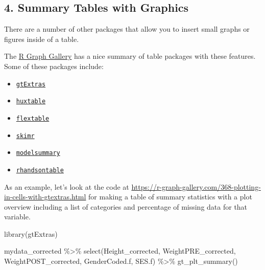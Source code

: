 \documentclass[
  letterpaper,
  DIV=11,
  numbers=noendperiod]{scrartcl}
\newenvironment{Shaded}{\begin{snugshade}}{\end{snugshade}}
\newcommand{\FunctionTok}[1]{\textcolor[rgb]{0.28,0.35,0.67}{#1}}
\newcommand{\NormalTok}[1]{\textcolor[rgb]{0.00,0.23,0.31}{#1}}
\newcommand{\SpecialCharTok}[1]{\textcolor[rgb]{0.37,0.37,0.37}{#1}}
\providecommand{\tightlist}{%
  \setlength{\itemsep}{0pt}\setlength{\parskip}{0pt}}\usepackage{longtable,booktabs,array}
\begin{document}
\subsection{4. Summary Tables with
Graphics}\label{summary-tables-with-graphics}

There are a number of other packages that allow you to insert small
graphs or figures inside of a table.

The \href{https://r-graph-gallery.com/table.html}{R Graph Gallery} has a
nice summary of table packages with these features. Some of these
packages include:

\begin{itemize}
\tightlist
\item
  \href{https://cran.r-project.org/web/packages/gtExtras/index.html}{\texttt{gtExtras}}
\item
  \href{https://cran.r-project.org/web/packages/huxtable/index.html}{\texttt{huxtable}}
\item
  \href{https://ardata-fr.github.io/flextable-book/index.html\#help-and-resources}{\texttt{flextable}}
\item
  \href{https://cran.r-project.org/web/packages/skimr/index.html}{\texttt{skimr}}
\item
  \href{https://modelsummary.com/vignettes/datasummary.html}{\texttt{modelsummary}}
\item
  \href{https://cran.r-project.org/web/packages/rhandsontable/index.html}{\texttt{rhandsontable}}
\end{itemize}

As an example, let's look at the code at
\url{https://r-graph-gallery.com/368-plotting-in-cells-with-gtextras.html}
for making a table of summary statistics with a plot overview including
a list of categories and percentage of missing data for that variable.

\begin{Shaded}
\begin{Highlighting}[]
\FunctionTok{library}\NormalTok{(gtExtras)}

\NormalTok{mydata\_corrected }\SpecialCharTok{\%\textgreater{}\%}
  \FunctionTok{select}\NormalTok{(Height\_corrected,}
\NormalTok{         WeightPRE\_corrected,}
\NormalTok{         WeightPOST\_corrected,}
\NormalTok{         GenderCoded.f,}
\NormalTok{         SES.f) }\SpecialCharTok{\%\textgreater{}\%}
  \FunctionTok{gt\_plt\_summary}\NormalTok{()}
\end{Highlighting}
\end{Shaded}
\end{document}
